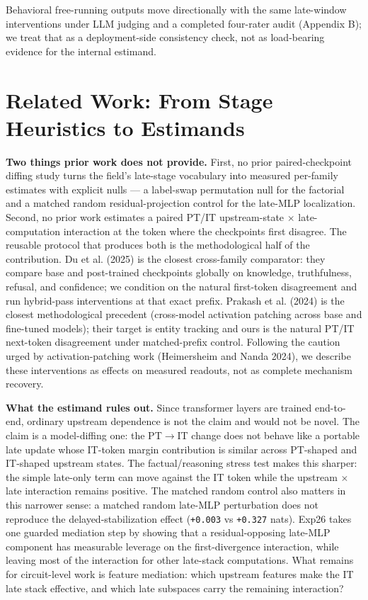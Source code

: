 \documentclass[11pt]{article}
\begin{document}
Behavioral free-running outputs move directionally with the same late-window interventions under LLM judging and a completed four-rater audit (Appendix B); we treat that as a deployment-side consistency check, not as load-bearing evidence for the internal estimand.

\section{Related Work: From Stage Heuristics to Estimands}

\textbf{Two things prior work does not provide.} First, no prior paired-checkpoint diffing study turns the field's late-stage vocabulary into measured per-family estimates with explicit nulls --- a label-swap permutation null for the factorial and a matched random residual-projection control for the late-MLP localization. Second, no prior work estimates a paired PT/IT upstream-state \ensuremath{\times} late-computation interaction at the token where the checkpoints first disagree. The reusable protocol that produces both is the methodological half of the contribution. Du et al. (2025) is the closest cross-family comparator: they compare base and post-trained checkpoints globally on knowledge, truthfulness, refusal, and confidence; we condition on the natural first-token disagreement and run hybrid-pass interventions at that exact prefix. Prakash et al. (2024) is the closest methodological precedent (cross-model activation patching across base and fine-tuned models); their target is entity tracking and ours is the natural PT/IT next-token disagreement under matched-prefix control. Following the caution urged by activation-patching work (Heimersheim and Nanda 2024), we describe these interventions as effects on measured readouts, not as complete mechanism recovery.

\textbf{What the estimand rules out.} Since transformer layers are trained end-to-end, ordinary upstream dependence is not the claim and would not be novel. The claim is a model-diffing one: the PT\ensuremath{\to}IT change does not behave like a portable late update whose IT-token margin contribution is similar across PT-shaped and IT-shaped upstream states. The factual/reasoning stress test makes this sharper: the simple late-only term can move against the IT token while the upstream \ensuremath{\times} late interaction remains positive. The matched random control also matters in this narrower sense: a matched random late-MLP perturbation does not reproduce the delayed-stabilization effect (\texttt{+0.003} vs \texttt{+0.327} nats). Exp26 takes one guarded mediation step by showing that a residual-opposing late-MLP component has measurable leverage on the first-divergence interaction, while leaving most of the interaction for other late-stack computations. What remains for circuit-level work is feature mediation: which upstream features make the IT late stack effective, and which late subspaces carry the remaining interaction?
\end{document}
